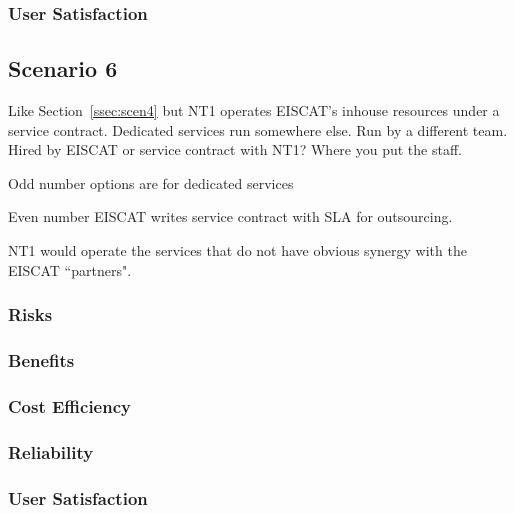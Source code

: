 \documentclass[12pt,a4paper]{article}
\begin{document}
\subsubsection*{User Satisfaction}
\bitm
\item 
\eitm

\subsection{Scenario 6}
\label{ssec:scen6}

Like Section~\ref{ssec:scen4} but NT1 operates EISCAT's inhouse resources under a service contract.
Dedicated services run somewhere else.
Run by a different team.
Hired by EISCAT or service contract with NT1?
Where you put the staff.

Odd number options are for dedicated services

Even number EISCAT writes service contract with SLA for outsourcing.

NT1 would operate the services that do not have obvious synergy with the EISCAT ``partners".

\subsubsection*{Risks}
\bitm
\item 
\eitm

\subsubsection*{Benefits}
\bitm
\item 
\eitm

\subsubsection*{Cost Efficiency}
\bitm
\item 
\eitm

\subsubsection*{Reliability}
\bitm
\item 
\eitm

\subsubsection*{User Satisfaction}
\bitm
\item 
\eitm
\newpage
{}

\end{document}
